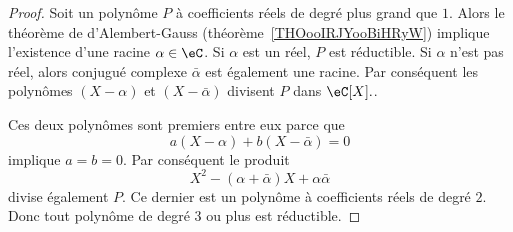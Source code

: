 \begin{proof}
    Soit un polynôme \( P\) à coefficients réels de degré plus grand que \( 1\). Alors le théorème de d'Alembert-Gauss (théorème~\ref{THOooIRJYooBiHRyW}) implique l'existence d'une racine \( \alpha \in \eC \). Si $\alpha$ est un réel, $P$ est réductible. Si \( \alpha\) n'est pas réel, alors conjugué complexe \( \bar \alpha\) est également une racine. Par conséquent les polynômes \( (X-\alpha)\) et \( (X-\bar \alpha)\) divisent \( P\) dans \( \eC[X]. \).

    Ces deux polynômes sont premiers entre eux parce que
    \begin{equation}
        a(X-\alpha)+b(X-\bar \alpha)=0
    \end{equation}
    implique \( a=b=0\). Par conséquent le produit
    \begin{equation}
        X^2-(\alpha+\bar \alpha)X+\alpha\bar\alpha
    \end{equation}
    divise également \( P\). Ce dernier est un polynôme à coefficients réels de degré \( 2\). Donc tout polynôme de degré \( 3\) ou plus est réductible.
\end{proof}
